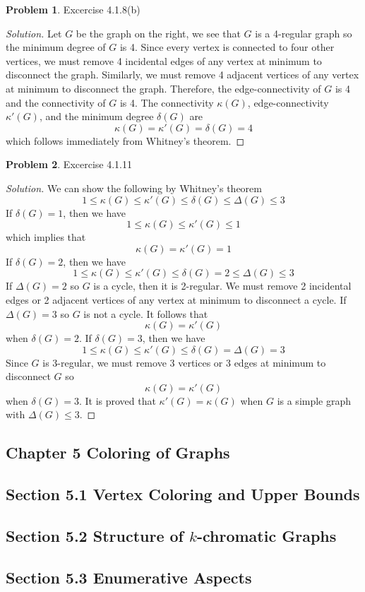 \documentclass[12pt]{article}
\theoremstyle{definition}
\newtheorem{problem}{Problem}
\newenvironment*{solution}{\begin{proof}[Solution]}{\end{proof}}
\begin{document}
\begin{problem}
    Excercise 4.1.8(b)
\end{problem}
\begin{solution}
    Let \(G\) be the graph on the right, we see that \(G\) is a 4-regular graph so the minimum degree of \(G\) is 4.
    Since every vertex is connected to four other vertices,
    we must remove 4 incidental edges of any vertex at minimum to disconnect the graph.
    Similarly, we must remove 4 adjacent vertices of any vertex at minimum to disconnect the graph.
    Therefore, the edge-connectivity of \(G\) is 4 and the connectivity of \(G\) is 4.
    The connectivity \(\kappa(G)\), edge-connectivity \(\kappa'(G)\), and the minimum degree \(\delta(G)\) are
    \[\kappa(G) = \kappa'(G) = \delta(G) = 4\] which follows immediately from Whitney's theorem.
\end{solution}

\begin{problem}
    Excercise 4.1.11
\end{problem}
\begin{solution}
    We can show the following by Whitney's theorem
    \[1 \leq \kappa(G) \leq \kappa'(G) \leq \delta(G) \leq \Delta(G) \leq 3\]
    If \(\delta(G)=1\), then we have \[1 \leq \kappa(G) \leq \kappa'(G) \leq 1\]
    which implies that \[\kappa(G) = \kappa'(G) = 1\]
    If \(\delta(G)=2\), then we have
    \[1 \leq \kappa(G) \leq \kappa'(G) \leq \delta(G)=2 \leq \Delta(G) \leq 3\]
    If \(\Delta(G)=2\) so \(G\) is a cycle, then it is 2-regular.
    We must remove 2 incidental edges or 2 adjacent vertices of any vertex at minimum to disconnect a cycle.
    If \(\Delta(G)=3\) so \(G\) is not a cycle.
    It follows that \[\kappa(G) = \kappa'(G)\] when \(\delta(G)=2\).
    If \(\delta(G)=3\), then we have
    \[1 \leq \kappa(G) \leq \kappa'(G) \leq \delta(G)=\Delta(G)=3\]
    Since \(G\) is 3-regular, we must remove 3 vertices or 3 edges at minimum to disconnect \(G\)
    so \[\kappa(G) = \kappa'(G)\] when \(\delta(G)=3\).
    It is proved that \(\kappa'(G)=\kappa(G)\) when \(G\) is a simple graph with \(\Delta(G)\leq3\).
\end{solution}

\subsection*{Chapter 5 Coloring of Graphs}
\subsection*{Section 5.1 Vertex Coloring and Upper Bounds}
\subsection*{Section 5.2 Structure of \(k\)-chromatic Graphs}
\subsection*{Section 5.3 Enumerative Aspects}
\end{document}
